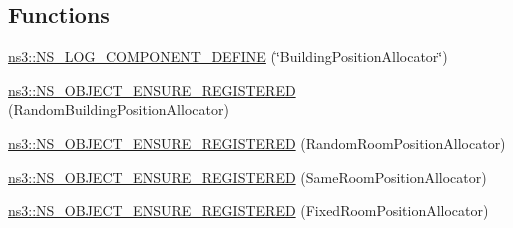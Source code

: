 \subsection*{Functions}
\begin{DoxyCompactItemize}
\item 
\hyperlink{namespacens3_a1728364ed782262e6cf4890e3873f634}{ns3\+::\+N\+S\+\_\+\+L\+O\+G\+\_\+\+C\+O\+M\+P\+O\+N\+E\+N\+T\+\_\+\+D\+E\+F\+I\+NE} (\char`\"{}Building\+Position\+Allocator\char`\"{})
\item 
\hyperlink{namespacens3_a64a6bbcd6e469f79fb8a4c2278bf986b}{ns3\+::\+N\+S\+\_\+\+O\+B\+J\+E\+C\+T\+\_\+\+E\+N\+S\+U\+R\+E\+\_\+\+R\+E\+G\+I\+S\+T\+E\+R\+ED} (Random\+Building\+Position\+Allocator)
\item 
\hyperlink{namespacens3_a4af6b321f32b63b82fa63861c2a00b4c}{ns3\+::\+N\+S\+\_\+\+O\+B\+J\+E\+C\+T\+\_\+\+E\+N\+S\+U\+R\+E\+\_\+\+R\+E\+G\+I\+S\+T\+E\+R\+ED} (Random\+Room\+Position\+Allocator)
\item 
\hyperlink{namespacens3_ab3fe1bfd35180361f2cebcb0eba82543}{ns3\+::\+N\+S\+\_\+\+O\+B\+J\+E\+C\+T\+\_\+\+E\+N\+S\+U\+R\+E\+\_\+\+R\+E\+G\+I\+S\+T\+E\+R\+ED} (Same\+Room\+Position\+Allocator)
\item 
\hyperlink{namespacens3_a5d993f050457b32b29a442b4192c4d38}{ns3\+::\+N\+S\+\_\+\+O\+B\+J\+E\+C\+T\+\_\+\+E\+N\+S\+U\+R\+E\+\_\+\+R\+E\+G\+I\+S\+T\+E\+R\+ED} (Fixed\+Room\+Position\+Allocator)
\end{DoxyCompactItemize}
